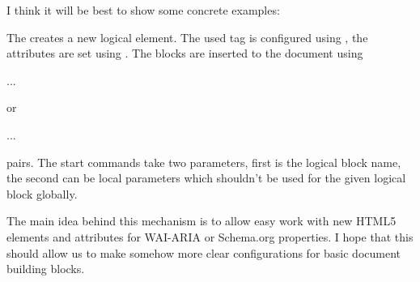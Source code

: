 I think it will be best to show some concrete examples:


\begin{texsource}



{\NoFonts{}}
{\EndNoFonts}

{}
{\NoFonts{}}
{\EndNoFonts}
\end{texsource}



The \texcommand{\NewLogicalBlock} creates a new logical element. The used tag is configured
using \texcommand{\SetTag}, the attributes are set using \texcommand{\SetBlockProperty}. The blocks are
inserted to the document using 

\begin{texsource}
\InlineElementStart ... \InlineElementEnd
\end{texsource}

\noindent or

\begin{texsource}
\BlockElementStart ... \BlockElementEnd 
\end{texsource}

\noindent pairs. The start commands take two
parameters, first is the logical block name, the second can be local
parameters which shouldn't be used for the given logical block globally.

The main idea behind this mechanism is to allow easy work with new HTML5
elements and attributes for WAI-ARIA or Schema.org properties. I hope that
this should allow us to make somehow more clear configurations for basic
document building blocks.
